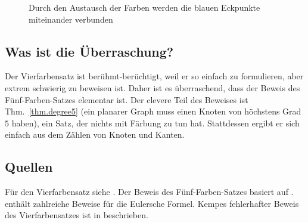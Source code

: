 \begin{figure}[ht]
\begin{minipage}{.45\textwidth}
\caption{Durch den Austausch der Farben werden die blauen Eckpunkte miteinander verbunden}\label{f.five-kempe2-share}
\end{minipage}
\end{figure}

\subsection*{Was ist die Überraschung?}

Der Vierfarbensatz ist berühmt-berüchtigt, weil er so einfach zu formulieren, aber extrem schwierig zu beweisen ist. Daher ist es überraschend, dass der Beweis des Fünf-Farben-Satzes elementar ist. Der clevere Teil des Beweises ist Thm.~\ref{thm.degree5} (ein planarer Graph muss einen Knoten von höchstens Grad $5$ haben), ein Satz, der nichts mit Färbung zu tun hat. Stattdessen ergibt er sich einfach aus dem Zählen von Knoten und Kanten.

\subsection*{Quellen}
Für den Vierfarbensatz siehe \cite{thomas,wiki:four}. Der Beweis des Fünf-Farben-Satzes basiert auf \cite{thebook,wiki:five}.
\cite{eppstein} enthält zahlreiche Beweise für die Eulersche Formel. Kempes fehlerhafter Beweis des Vierfarbensatzes ist in \cite{sipka} beschrieben.
